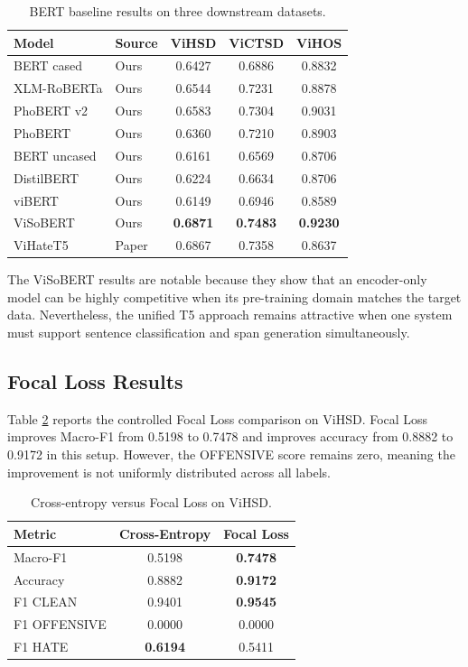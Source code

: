 \documentclass[journal]{IEEEtran}
\newcommand{\mf}{Macro-F1}
\newcommand{\acc}{Accuracy}
\begin{document}
\begin{table}[!t]
\centering
\caption{BERT baseline results on three downstream datasets.}
\label{tab:bert}
\begin{tabular}{llccc}
\toprule
\textbf{Model} & \textbf{Source} & \textbf{ViHSD} & \textbf{ViCTSD} & \textbf{ViHOS} \\
\midrule
BERT cased & Ours & 0.6427 & 0.6886 & 0.8832 \\
XLM-RoBERTa & Ours & 0.6544 & 0.7231 & 0.8878 \\
PhoBERT v2 & Ours & 0.6583 & 0.7304 & 0.9031 \\
PhoBERT & Ours & 0.6360 & 0.7210 & 0.8903 \\
BERT uncased & Ours & 0.6161 & 0.6569 & 0.8706 \\
DistilBERT & Ours & 0.6224 & 0.6634 & 0.8706 \\
viBERT & Ours & 0.6149 & 0.6946 & 0.8589 \\
ViSoBERT & Ours & \textbf{0.6871} & \textbf{0.7483} & \textbf{0.9230} \\
ViHateT5 & Paper & 0.6867 & 0.7358 & 0.8637 \\
\bottomrule
\end{tabular}
\end{table}

The ViSoBERT results are notable because they show that an encoder-only model can be highly competitive when its pre-training domain matches the target data. Nevertheless, the unified T5 approach remains attractive when one system must support sentence classification and span generation simultaneously.

\subsection{Focal Loss Results}
Table \ref{tab:focal} reports the controlled Focal Loss comparison on ViHSD. Focal Loss improves \mf{} from 0.5198 to 0.7478 and improves accuracy from 0.8882 to 0.9172 in this setup. However, the OFFENSIVE score remains zero, meaning the improvement is not uniformly distributed across all labels.

\begin{table}[!t]
\centering
\caption{Cross-entropy versus Focal Loss on ViHSD.}
\label{tab:focal}
\begin{tabular}{lcc}
\toprule
\textbf{Metric} & \textbf{Cross-Entropy} & \textbf{Focal Loss} \\
\midrule
\mf{} & 0.5198 & \textbf{0.7478} \\
\acc{} & 0.8882 & \textbf{0.9172} \\
F1 CLEAN & 0.9401 & \textbf{0.9545} \\
F1 OFFENSIVE & 0.0000 & 0.0000 \\
F1 HATE & \textbf{0.6194} & 0.5411 \\
\bottomrule
\end{tabular}
\end{table}
\end{document}
